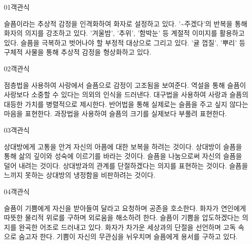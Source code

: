 \documentclass[fs85,seriesWit]{korfarm-base}
\begin{document}
\kfBeginMC
\begin{kfQBlock}{01}{객관식}
\begin{kfChoices}
\kfChoice 슬픔이라는 추상적 감정을 인격화하여 화자로 설정하고 있다.
\kfChoice '\textasciitilde{}주겠다'의 반복을 통해 화자의 의지를 강조하고 있다.
\kfChoice '겨울밤', '추위', '함박눈' 등 계절적 이미지를 활용하고 있다.
\kfChoice 슬픔을 극복하고 벗어나야 할 부정적 대상으로 그리고 있다.
\kfChoice '귤 껍질', '뿌리' 등 구체적 사물을 통해 추상적 감정을 형상화하고 있다.
\end{kfChoices}
\end{kfQBlock}

\begin{kfQBlock}{02}{객관식}
\begin{kfChoices}
\kfChoice 점층법을 사용하여 사랑에서 슬픔으로 감정이 고조됨을 보여준다.
\kfChoice 역설을 통해 슬픔이 사랑보다 소중할 수 있다는 의외의 인식을 드러낸다.
\kfChoice 대구법을 사용하여 사랑과 슬픔의 대등한 가치를 병렬적으로 제시한다.
\kfChoice 반어법을 통해 실제로는 슬픔을 주고 싶지 않다는 마음을 표현한다.
\kfChoice 과장법을 사용하여 슬픔의 크기를 실제보다 부풀려 표현한다.
\end{kfChoices}
\end{kfQBlock}

\begin{kfQBlock}{03}{객관식}
\begin{kfChoices}
\kfChoice 상대방에게 고통을 안겨 자신의 아픔에 대한 보복을 하려는 것이다.
\kfChoice 상대방이 슬픔을 통해 삶의 깊이와 성숙에 이르기를 바라는 것이다.
\kfChoice 슬픔을 나눔으로써 자신의 슬픔을 덜어 내려는 것이다.
\kfChoice 상대방과의 관계를 단절하겠다는 의지를 표현하는 것이다.
\kfChoice 슬픔을 느끼지 못하는 상대방의 냉정함을 비판하려는 것이다.
\end{kfChoices}
\end{kfQBlock}

\begin{kfQBlock}{04}{객관식}
\begin{kfChoices}
\kfChoice 슬픔이 기쁨에게 자신을 받아들여 달라고 요청하며 공존을 호소한다.
\kfChoice 화자가 연인에게 따뜻한 물리적 위로를 구하며 외로움을 해소하려 한다.
\kfChoice 슬픔이 기쁨을 압도하겠다는 의지를 완곡한 어조로 드러내고 있다.
\kfChoice 화자가 차가운 세상과의 단절을 선언하며 고독 속으로 숨고자 한다.
\kfChoice 기쁨이 자신의 무관심을 뉘우치며 슬픔에게 용서를 구하고 있다.
\end{kfChoices}
\end{kfQBlock}
\end{document}
